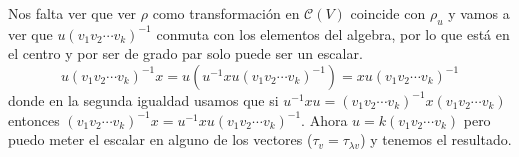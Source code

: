 \documentclass[12pt]{amsart}
\newcommand{\QQ}{\mathbb{Q}}
\newcommand{\cont}{\mathcal{C}}
\newcommand{\lp}{\left(}
\newcommand{\rp}{\right)}
\theoremstyle{plain}
\begin{document}
Nos falta ver que ver $\rho$ como transformación en $\cont(V)$ 
coincide con $\rho_u$ y vamos a ver que $u(v_1v_2\cdots v_k)^{-1}$
conmuta con los elementos del algebra, por lo que está en el centro
y por ser de grado par solo puede ser un escalar.
$$u(v_1v_2\cdots v_k)^{-1}x =u\lp u^{-1}xu(v_1v_2\cdots v_k)^{-1}\rp 
= xu(v_1v_2\cdots v_k)^{-1}$$
donde en la segunda igualdad usamos que si $u^{-1}xu=
(v_1v_2\cdots v_k)^{-1}x(v_1v_2\cdots v_k)$ entonces 
$(v_1v_2\cdots v_k)^{-1}x = u^{-1}xu(v_1v_2\cdots v_k)^{-1}$.
Ahora $u=k(v_1v_2\cdots v_k)$ pero puedo meter el escalar en alguno
de los vectores ($\tau_v=\tau_{\lambda v}$) y tenemos el resultado.










\end{document}
